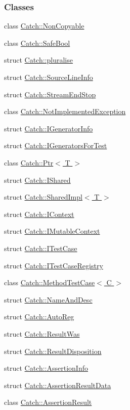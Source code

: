 \subsubsection*{Classes}
\begin{DoxyCompactItemize}
\item 
class \hyperlink{a00054}{Catch\+::\+Non\+Copyable}
\item 
class \hyperlink{a00070}{Catch\+::\+Safe\+Bool}
\item 
struct \hyperlink{a00064}{Catch\+::pluralise}
\item 
struct \hyperlink{a00075}{Catch\+::\+Source\+Line\+Info}
\item 
struct \hyperlink{a00077}{Catch\+::\+Stream\+End\+Stop}
\item 
class \hyperlink{a00055}{Catch\+::\+Not\+Implemented\+Exception}
\item 
struct \hyperlink{a00035}{Catch\+::\+I\+Generator\+Info}
\item 
struct \hyperlink{a00036}{Catch\+::\+I\+Generators\+For\+Test}
\item 
class \hyperlink{a00065}{Catch\+::\+Ptr$<$ T $>$}
\item 
struct \hyperlink{a00042}{Catch\+::\+I\+Shared}
\item 
struct \hyperlink{a00074}{Catch\+::\+Shared\+Impl$<$ T $>$}
\item 
struct \hyperlink{a00031}{Catch\+::\+I\+Context}
\item 
struct \hyperlink{a00037}{Catch\+::\+I\+Mutable\+Context}
\item 
struct \hyperlink{a00045}{Catch\+::\+I\+Test\+Case}
\item 
struct \hyperlink{a00046}{Catch\+::\+I\+Test\+Case\+Registry}
\item 
class \hyperlink{a00051}{Catch\+::\+Method\+Test\+Case$<$ C $>$}
\item 
struct \hyperlink{a00053}{Catch\+::\+Name\+And\+Desc}
\item 
struct \hyperlink{a00007}{Catch\+::\+Auto\+Reg}
\item 
struct \hyperlink{a00069}{Catch\+::\+Result\+Was}
\item 
struct \hyperlink{a00068}{Catch\+::\+Result\+Disposition}
\item 
struct \hyperlink{a00004}{Catch\+::\+Assertion\+Info}
\item 
struct \hyperlink{a00006}{Catch\+::\+Assertion\+Result\+Data}
\item 
class \hyperlink{a00005}{Catch\+::\+Assertion\+Result}

\end{DoxyCompactItemize}
